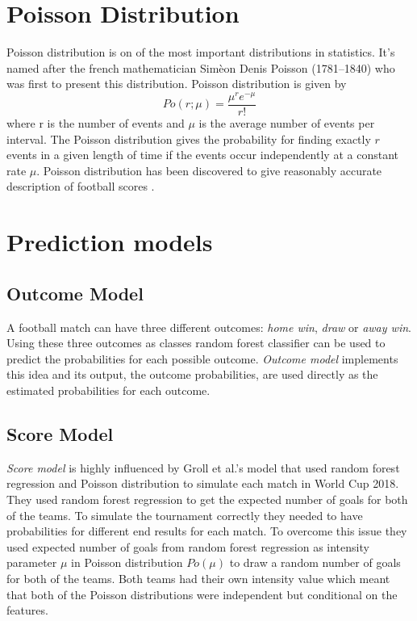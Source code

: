 \section{Poisson Distribution}
Poisson distribution is on of the most important distributions in statistics. It's named after the french mathematician Simèon Denis Poisson (1781–1840) who was first to present this distribution. Poisson distribution is given by
\begin{equation}
    Po ( r ; \mu ) = \frac { \mu ^ { r } e ^ { - \mu } } { r ! }
\end{equation}
where r is the number of events and $\mu$ is the average number of events per interval. The Poisson distribution gives the probability for finding exactly $r$ events in a given length of time if the events occur independently at a constant rate $\mu$. \cite{walck1996hand} Poisson distribution has been discovered to give reasonably accurate description of football scores \cite{maher1982modelling}.
\section{Prediction models}
\subsection{Outcome Model}
A football match can have three different outcomes: \textit{home win}, \textit{draw} or \textit{away win}. Using these three outcomes as classes random forest classifier can be used to predict the probabilities for each possible outcome. \textit{Outcome model} implements this idea and its output, the outcome probabilities, are used directly as the estimated probabilities for each outcome.
\subsection{Score Model}
\textit{Score model} is highly influenced by Groll et al.'s \cite{groll2018prediction} model that used random forest regression and Poisson distribution to simulate each match in World Cup 2018. They used random forest regression to get the expected number of goals for both of the teams. To simulate the tournament correctly they needed to have probabilities for different end results for each match. To overcome this issue they used expected number of goals from random forest regression as intensity parameter $\mu$ in Poisson distribution $Po(\mu)$ to draw a random number of goals for both of the teams. Both teams had their own intensity value which meant that both of the Poisson distributions were independent but conditional on the features.

